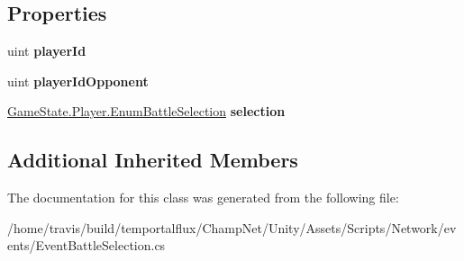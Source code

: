 \subsection*{Properties}
\begin{DoxyCompactItemize}
\item 
\hypertarget{class_event_battle_selection_acb6d735a144f55f502f35f3728e64fa7}{uint {\bfseries player\-Id}}\label{class_event_battle_selection_acb6d735a144f55f502f35f3728e64fa7}

\item 
\hypertarget{class_event_battle_selection_a4b91cf6aadc6b2c1073413811e764903}{uint {\bfseries player\-Id\-Opponent}}\label{class_event_battle_selection_a4b91cf6aadc6b2c1073413811e764903}

\item 
\hypertarget{class_event_battle_selection_afc0c2c21a8b44a5afc75a61df7a9597b}{\hyperlink{struct_game_state_1_1_player_a9f54c5eca1e60acbaa2074e981f51615}{Game\-State.\-Player.\-Enum\-Battle\-Selection} {\bfseries selection}}\label{class_event_battle_selection_afc0c2c21a8b44a5afc75a61df7a9597b}

\end{DoxyCompactItemize}
\subsection*{Additional Inherited Members}


The documentation for this class was generated from the following file\-:\begin{DoxyCompactItemize}
\item 
/home/travis/build/temportalflux/\-Champ\-Net/\-Unity/\-Assets/\-Scripts/\-Network/events/Event\-Battle\-Selection.\-cs\end{DoxyCompactItemize}
